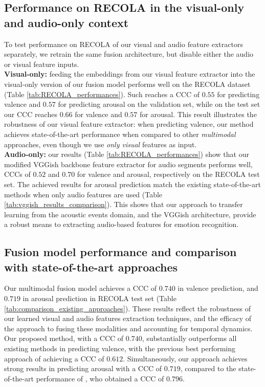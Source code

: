 \documentclass[times,twocolumn,final,authoryear]{elsarticle}
\begin{document}
	
	
	
	
	\subsection{Performance on RECOLA in the visual-only and audio-only context}
	To test performance on RECOLA of our visual and audio feature extractors separately, we retrain the same fusion architecture, but disable either the audio or visual feature inputs.\\
	
	
	\textbf{Visual-only:} feeding the embeddings from our visual feature extractor into the visual-only version of our fusion model performs well on the RECOLA dataset (Table \ref{tab:RECOLA_performances}). Such reaches a CCC of $0.55$ for predicting valence and $0.57$ for predicting arousal on the validation set, while on the test set our CCC reaches $0.66$ for valence and $0.57$ for arousal. This result illustrates the robustness of our visual feature extractor: when predicting valence, our method achieves state-of-the-art performance when compared to other \textit{multimodal} approaches, even though we use \textit{only visual} features as input.\\
	\textbf{Audio-only:} our results (Table \ref{tab:RECOLA_performances}) show that our modified VGGish backbone feature extractor for audio segments performs well, CCCs of $0.52$ and $0.70$ for valence and arousal, respectively on the RECOLA test set. The achieved results for arousal prediction match the existing state-of-the-art methods when only audio features are used (Table \ref{tab:vggish_results_comparison}). This shows that our approach to transfer learning from the acoustic events domain, and the VGGish architecture, provide a robust means to extracting audio-based features for emotion recognition.
	
	\subsection{Fusion model performance and comparison with state-of-the-art approaches}
	
	Our multimodal fusion model achieves a CCC of $0.740$ in valence prediction, and $0.719$ in arousal prediction in RECOLA test set (Table \ref{tab:comparison_existing_approaches}). These results reflect the robustness of our learned visual and audio features extraction techniques, and the efficacy of the approach to fusing these modalities and accounting for temporal dynamics. Our proposed method, with a CCC of $0.740$, substantially outperforms all existing methods in predicting valence, with the previous best performing approach of \cite{Tzarakis2017} achieving a CCC of $0.612$. Simultaneously, our approach achieves strong results in predicting arousal with a CCC of $0.719$, compared to the state-of-the-art performance of \cite{Ringeval2015}, who obtained a CCC of $0.796$.
	
\end{document}
